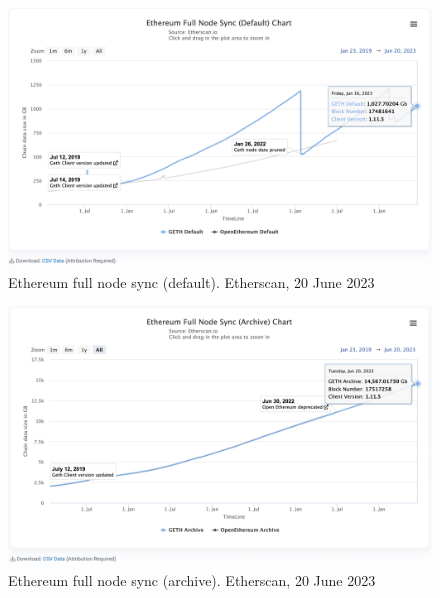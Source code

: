 \documentclass[UTF8]{article}
\begin{document}
{%

\begin{figure}[htbp]
\begin{center}
\includegraphics[width=0.9\linewidth]{images/ethsync}
\caption{Ethereum full node sync (default). Etherscan, 20 June 2023}
\label{fig:ethsync}
\end{center}
\end{figure}

\begin{figure}[htbp]
\begin{center}
\includegraphics[width=0.9\linewidth]{images/etharch}
\caption{Ethereum full node sync (archive). Etherscan, 20 June 2023}
\label{fig:etharch}
\end{center}
\end{figure}

}
\end{document}
